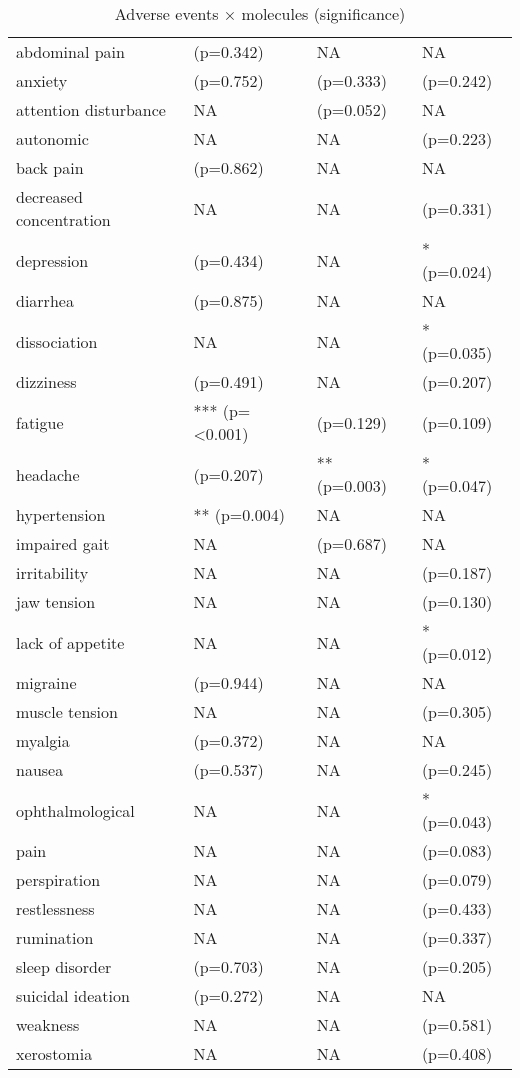 \begin{table}[!h]
\centering
\caption{Adverse events × molecules (significance)}
\centering
\begin{tabular}[t]{llll}
\toprule
abdominal pain & (p=0.342) & NA & NA\\
anxiety & (p=0.752) & (p=0.333) & (p=0.242)\\
attention disturbance & NA & (p=0.052) & NA\\
autonomic & NA & NA & (p=0.223)\\
back pain & (p=0.862) & NA & NA\\
\addlinespace
decreased concentration & NA & NA & (p=0.331)\\
depression & (p=0.434) & NA & * (p=0.024)\\
diarrhea & (p=0.875) & NA & NA\\
dissociation & NA & NA & * (p=0.035)\\
dizziness & (p=0.491) & NA & (p=0.207)\\
\addlinespace
fatigue & *** (p=<0.001) & (p=0.129) & (p=0.109)\\
headache & (p=0.207) & ** (p=0.003) & * (p=0.047)\\
hypertension & ** (p=0.004) & NA & NA\\
impaired gait & NA & (p=0.687) & NA\\
irritability & NA & NA & (p=0.187)\\
\addlinespace
jaw tension & NA & NA & (p=0.130)\\
lack of appetite & NA & NA & * (p=0.012)\\
migraine & (p=0.944) & NA & NA\\
muscle tension & NA & NA & (p=0.305)\\
myalgia & (p=0.372) & NA & NA\\
\addlinespace
nausea & (p=0.537) & NA & (p=0.245)\\
ophthalmological & NA & NA & * (p=0.043)\\
pain & NA & NA & (p=0.083)\\
perspiration & NA & NA & (p=0.079)\\
restlessness & NA & NA & (p=0.433)\\
\addlinespace
rumination & NA & NA & (p=0.337)\\
sleep disorder & (p=0.703) & NA & (p=0.205)\\
suicidal ideation & (p=0.272) & NA & NA\\
weakness & NA & NA & (p=0.581)\\
xerostomia & NA & NA & (p=0.408)\\
\bottomrule
\end{tabular}
\end{table}
